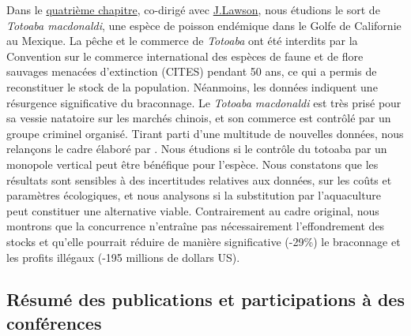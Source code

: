 Dans le \hyperref[chapitre4]{quatrième chapitre}, co-dirigé avec \href{https://www.juliamlawson.com/}{J.Lawson}, nous étudions le sort de \textit{Totoaba macdonaldi}, une espèce de poisson endémique dans le Golfe de Californie au Mexique. La pêche et le commerce de \textit{Totoaba} ont été interdits par la Convention sur le commerce international des espèces de faune et de flore sauvages menacées d'extinction (CITES) pendant 50 ans, ce qui a permis de reconstituer le stock de la population. Néanmoins, les données indiquent une résurgence significative du braconnage. Le \textit{Totoaba macdonaldi} est très prisé pour sa vessie natatoire sur les marchés chinois, et son commerce est contrôlé par un groupe criminel organisé. Tirant parti d'une multitude de nouvelles données, nous relançons le cadre élaboré par \cite{damania_economics_2007}. Nous étudions si le contrôle du totoaba par un monopole vertical peut être bénéfique pour l'espèce. Nous constatons que les résultats sont sensibles à des incertitudes relatives aux données, sur les coûts et paramètres écologiques, et nous analysons si la substitution par l'aquaculture peut constituer une alternative viable. Contrairement au cadre original, nous montrons que la concurrence n'entraîne pas nécessairement l'effondrement des stocks et qu'elle pourrait réduire de manière significative (-29\%) le braconnage et les profits illégaux (-195 millions de dollars US).

\clearpage

{}
\subsection*{Résumé des publications et participations à des conférences}


\singlespacing

